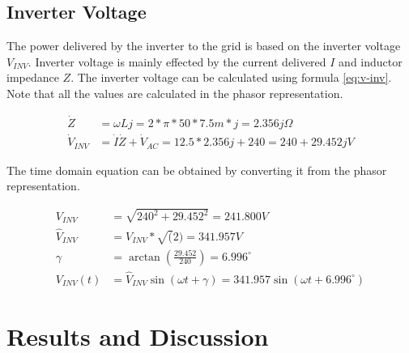 \documentclass[12pt]{article}
\begin{document}
\subsection{Inverter Voltage}

The power delivered by the inverter to the grid is based on the inverter voltage $V_{INV}$.
Inverter voltage is mainly effected by the current delivered $I$ and inductor impedance $Z$.
The inverter voltage can be calculated using formula \ref{eq:v-inv}.
Note that all the values are calculated in the phasor representation.

\begin{equation} \label{eq:v-inv}
    \begin{aligned}
        \dot{Z}       & = \omega{L}j = 2 * \pi * 50 * 7.5m * j = 2.356j \Omega                   \\
        \dot{V}_{INV} & = \dot{I} \dot{Z} + \dot{V}_{AC} = 12.5 * 2.356j + 240 = 240 + 29.452j V
    \end{aligned}
\end{equation}

The time domain equation can be obtained by converting it from the phasor representation.

\begin{equation}
    \begin{aligned}
        V_{INV}       & = \sqrt{240^2 + 29.452^2} = 241.800 V                                                  \\
        \hat{V}_{INV} & = V_{INV} * \sqrt(2) = 341.957 V                                                       \\
        \gamma        & = \arctan(\frac{29.452}{240}) = 6.996^{\circ{}}                                        \\
        V_{INV}(t)    & = \hat{V}_{INV} \sin(\omega{t} + \gamma{}) = 341.957 \sin(\omega{t} + 6.996^{\circ{}})
    \end{aligned}
\end{equation}

\section{Results and Discussion}
\end{document}
